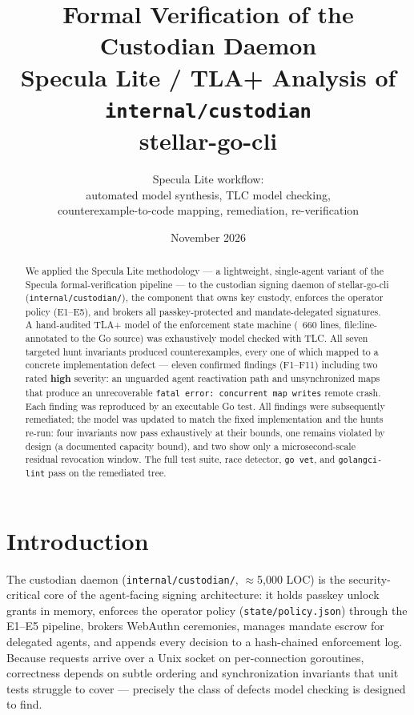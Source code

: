 \documentclass[11pt]{article}
\title{\textbf{Formal Verification of the Custodian Daemon}\\[4pt]
       \large Specula Lite / TLA+ Analysis of \texttt{internal/custodian}\\[2pt]
       \normalsize stellar-go-cli}
\author{Specula Lite workflow:\\[2pt]
        \normalsize automated model synthesis, TLC model checking,\\
        \normalsize counterexample-to-code mapping, remediation, re-verification}
\date{November 2026}
\newcommand{\code}[1]{\texttt{#1}}
\newcommand{\file}[1]{\texttt{#1}}
\newcommand{\sev}[1]{\textbf{#1}}
\begin{document}
\maketitle

\begin{abstract}
\noindent
We applied the Specula Lite methodology — a lightweight, single-agent variant of
the Specula formal-verification pipeline — to the custodian signing daemon of
stellar-go-cli (\file{internal/custodian/}), the component that owns key custody,
enforces the operator policy (E1--E5), and brokers all passkey-protected and
mandate-delegated signatures. A hand-audited TLA+ model of the enforcement state
machine (~660 lines, file:line-annotated to the Go source) was exhaustively model
checked with TLC. All seven targeted hunt invariants produced counterexamples,
every one of which mapped to a concrete implementation defect — eleven confirmed
findings (F1--F11) including two rated \sev{high} severity: an unguarded agent
reactivation path and unsynchronized maps that produce an unrecoverable
\code{fatal error: concurrent map writes} remote crash. Each finding was
reproduced by an executable Go test. All findings were subsequently remediated;
the model was updated to match the fixed implementation and the hunts re-run:
four invariants now pass exhaustively at their bounds, one remains violated by
design (a documented capacity bound), and two show only a microsecond-scale
residual revocation window. The full test suite, race detector, \code{go vet},
and \code{golangci-lint} pass on the remediated tree.
\end{abstract}

\tableofcontents
\newpage

\section{Introduction}

The custodian daemon (\file{internal/custodian/}, $\approx$5{,}000 LOC) is the
security-critical core of the agent-facing signing architecture: it holds
passkey unlock grants in memory, enforces the operator policy
(\file{state/policy.json}) through the E1--E5 pipeline, brokers WebAuthn
ceremonies, manages mandate escrow for delegated agents, and appends every
decision to a hash-chained enforcement log. Because requests arrive over a Unix
socket on per-connection goroutines, correctness depends on subtle ordering and
synchronization invariants that unit tests struggle to cover — precisely the
class of defects model checking is designed to find.
\end{document}
